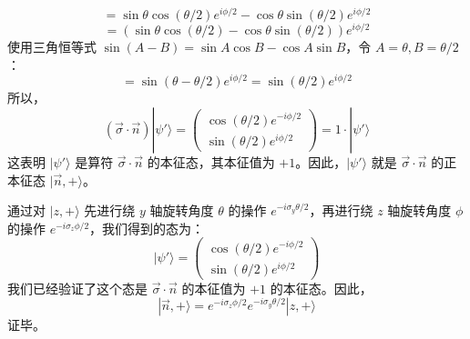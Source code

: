 \documentclass{article}
\begin{document}
\[ = \sin\theta \cos(\theta/2)e^{i\phi/2} - \cos\theta \sin(\theta/2)e^{i\phi/2} \]
\[ = (\sin\theta \cos(\theta/2) - \cos\theta \sin(\theta/2))e^{i\phi/2} \]
使用三角恒等式 \(\sin(A-B) = \sin A \cos B - \cos A \sin B\)，令 \(A=\theta, B=\theta/2\)：
\[ = \sin(\theta - \theta/2)e^{i\phi/2} = \sin(\theta/2)e^{i\phi/2} \]
所以，
\[ (\vec{\sigma} \cdot \vec{n}) |\psi'\rangle = \begin{pmatrix} \cos(\theta/2)e^{-i\phi/2} \\ \sin(\theta/2)e^{i\phi/2} \end{pmatrix} = 1 \cdot |\psi'\rangle \]
这表明 \(|\psi'\rangle\) 是算符 \(\vec{\sigma} \cdot \vec{n}\) 的本征态，其本征值为 \(+1\)。因此，\(|\psi'\rangle\) 就是 \(\vec{\sigma} \cdot \vec{n}\) 的正本征态 \(|\vec{n},+\rangle\)。

通过对 \(|z,+\rangle\) 先进行绕 \(y\) 轴旋转角度 \(\theta\) 的操作 \(e^{-i\sigma_y \theta/2}\)，再进行绕 \(z\) 轴旋转角度 \(\phi\) 的操作 \(e^{-i\sigma_z \phi/2}\)，我们得到的态为：
\[ |\psi'\rangle = \begin{pmatrix} \cos(\theta/2)e^{-i\phi/2} \\ \sin(\theta/2)e^{i\phi/2} \end{pmatrix} \]
我们已经验证了这个态是 \(\vec{\sigma} \cdot \vec{n}\) 的本征值为 \(+1\) 的本征态。因此，
\[ |\vec{n},+\rangle = e^{-i\sigma_z \phi/2} e^{-i\sigma_y \theta/2} |z,+\rangle \]
证毕。
\end{document}
